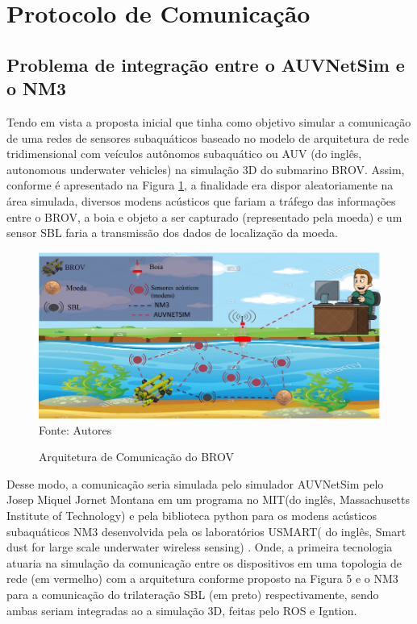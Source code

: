 \section{Protocolo de Comunicação}

\subsection{Problema de integração entre o AUVNetSim e o NM3}

Tendo em vista a proposta inicial que tinha como objetivo simular a comunicação de uma redes de sensores subaquáticos baseado no modelo de arquitetura de rede tridimensional com veículos autônomos subaquático ou AUV (do inglês, autonomous underwater vehicles)  \cite{akyildiz2005underwater} na simulação 3D do submarino BROV. Assim, conforme é apresentado na Figura \ref{fig:arquitetura-comunicacao-brov}, a finalidade era dispor aleatoriamente na área simulada, diversos modens acústicos que fariam a tráfego das informações entre o BROV, a boia e objeto a ser capturado (representado pela moeda) e um sensor SBL faria a transmissão dos dados de localização da moeda. 

\begin{figure}[h]
	\centering
	\caption[Arquitetura de Comunicação do BROV]{Arquitetura de Comunicação do BROV}
	\label{fig:arquitetura-comunicacao-brov}
	\includegraphics[width=0.8\linewidth]{images/arquitetura-comunicacao-brov}\\
	\footnotesize Fonte: Autores
\end{figure}


Desse modo, a comunicação seria simulada pelo simulador AUVNetSim pelo Josep Miquel Jornet Montana em um programa no MIT(do inglês, Massachusetts Institute of Technology) \cite{montana2008auvnetsim} e pela biblioteca python para os modens acústicos subaquáticos NM3 desenvolvida pela os laboratórios USMART( do inglês, Smart dust for large scale underwater wireless sensing) \cite{8248761}. Onde, a primeira tecnologia atuaria na simulação da comunicação entre os dispositivos em uma topologia de rede (em vermelho) com a arquitetura conforme proposto na Figura 5 e o NM3 para a comunicação do trilateração SBL (em preto) respectivamente, sendo ambas seriam integradas ao a simulação 3D, feitas pelo ROS e Igntion.

